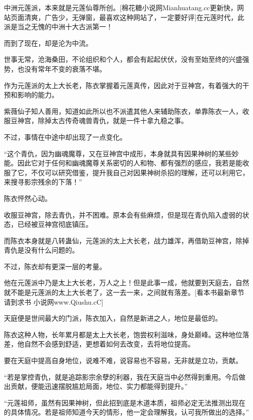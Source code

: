 
\begin{this_body}

中洲元莲派，本来就是元莲仙尊所创。[棉花糖小说网Mianhuatang.cc更新快，网站页面清爽，广告少，无弹窗，最喜欢这种网站了，一定要好评]在元莲时代，此派是当之无愧的中洲十大古派第一！

而到了现在，却是沦为中流。

世事无常，沧海桑田，不论组织和个人，都会有起起伏伏，没有至始至终的兴盛强势，也没有常年不变的衰落不堪。

作为元莲派的太上大长老，陈衣掌握着元莲真传，因此对于豆神宫，有着强大的干预和影响的能力。

紫薇仙子知人善用，知道如此所以也不派遣其他人来辅助陈衣，单靠陈衣一人，收服豆神宫，除掉太古传奇魂兽青仇，就是一件十拿九稳之事。

不过，事情在中途中却出现了一点变化。

“这个青仇，因为幽魂魔尊，又在豆神宫中成形，本身就具有因果神树的某些妙能。因此它对于任何和幽魂魔尊关系密切的人和物、都有强烈的感应，我若是能收服了它，不仅可以研究借鉴，提升我自己对因果神树杀招的理解，还可以利用它，来搜寻影宗残余的下落！”

陈衣怦然心动。

收服豆神宫，除去青仇，并不困难。原本会有些麻烦，但是现在青仇陷入虚弱的状态，已经被豆神宫彻底镇压。

而陈衣本身就是八转蛊仙，元莲派的太上大长老，战力雄浑，再借助豆神宫，除掉青仇是没有什么问题的。

不过，陈衣却有更深一层的考量。

他在元莲派中乃是太上大长老，万人之上！但是此事一成，他就要到天庭去，自然就不能是元莲派的太上大长老了，这一去一来，之间就有落差。[看本书最新章节请到求书 小说网www.Qiushu.cC]

天庭便是世间最大的门派，陈衣加入，自然是新进之人，地位是最低的。

陈衣这种人物，长年累月都是太上大长老，饱尝权利滋味，身处巅峰。这种地位落差，他自然不会感到舒适，更想着如何去改变，去将地位提高。

要在天庭中提高自身地位，说难不难，说容易也不容易，无非就是立功，贡献。

“若是掌控青仇，就是追踪影宗余孽的利器，我在天庭当中必然得到重用。今后做出贡献，便能迅速摆脱尴尬局面，地位、实力都能得到提升。”

“元莲祖师，虽然有因果神树，但此招到底是木道本质，祖师必定无法推测出现在的具体情况。若是祖师知道今天的情形，他一定会理解我，认可我所做出的选择。”


\end{this_body}
